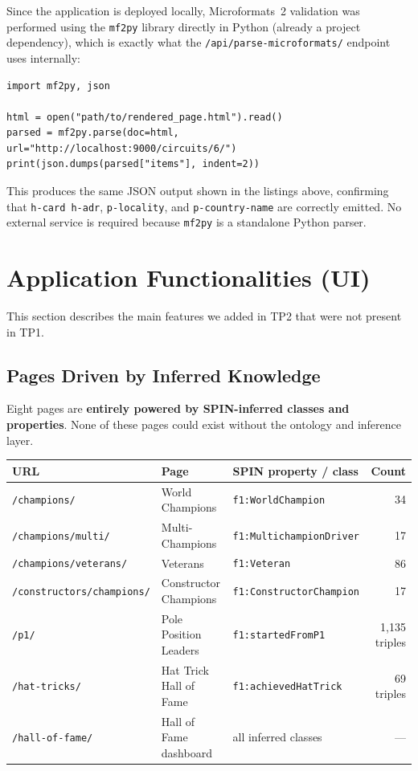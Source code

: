 \documentclass[12pt,a4paper]{article}
\begin{document}
Since the application is deployed locally, Microformats~2 validation was performed
using the \texttt{mf2py} library directly in Python (already a project dependency),
which is exactly what the \texttt{/api/parse-microformats/} endpoint uses internally:

\begin{lstlisting}[style=python, caption={Local MF2 validation script (run from project root)}]
import mf2py, json

html = open("path/to/rendered_page.html").read()
parsed = mf2py.parse(doc=html, url="http://localhost:9000/circuits/6/")
print(json.dumps(parsed["items"], indent=2))
\end{lstlisting}

This produces the same JSON output shown in the listings above, confirming that
\texttt{h-card h-adr}, \texttt{p-locality}, and \texttt{p-country-name} are
correctly emitted. No external service is required because \texttt{mf2py} is
a standalone Python parser.

\section{Application Functionalities (UI)}

This section describes the main features we added in TP2 that were not present in TP1.

\subsection{Pages Driven by Inferred Knowledge}

Eight pages are \textbf{entirely powered by SPIN-inferred classes and properties}.
None of these pages could exist without the ontology and inference layer.

\begin{center}
\begin{tabular}{@{}lllr@{}}
\toprule
\textbf{URL} & \textbf{Page} & \textbf{SPIN property / class} & \textbf{Count} \\
\midrule
\texttt{/champions/}           & World Champions        & \texttt{f1:WorldChampion}          & 34 \\
\texttt{/champions/multi/}     & Multi-Champions        & \texttt{f1:MultichampionDriver}    & 17 \\
\texttt{/champions/veterans/}  & Veterans               & \texttt{f1:Veteran}                & 86 \\
\texttt{/constructors/champions/} & Constructor Champions & \texttt{f1:ConstructorChampion}  & 17 \\
\texttt{/p1/}                  & Pole Position Leaders  & \texttt{f1:startedFromP1}          & 1{,}135 triples \\
\texttt{/hat-tricks/}          & Hat Trick Hall of Fame & \texttt{f1:achievedHatTrick}       & 69 triples \\
\texttt{/hall-of-fame/}        & Hall of Fame dashboard & all inferred classes               & — \\
\bottomrule
\end{tabular}
\end{center}
\end{document}
